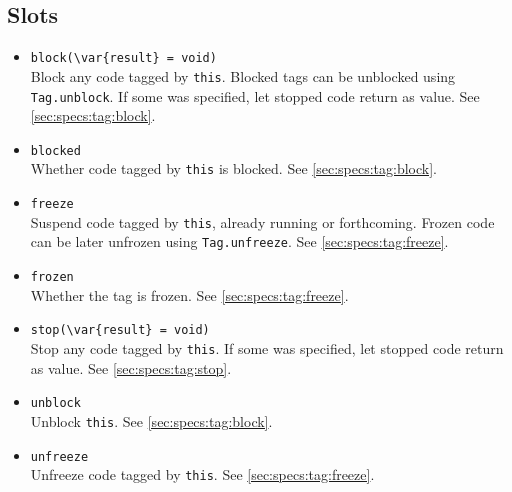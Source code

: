 \subsection{Slots}

\begin{itemize}
\item \lstinline|block(\var{result} = void)|~\\
  Block any code tagged by \lstinline|this|.  Blocked tags can be
  unblocked using \lstinline|Tag.unblock|.  If some  was
  specified, let stopped code return  as value.  See
  \autoref{sec:specs:tag:block}.

\item \lstinline|blocked|~\\
  Whether code tagged by \lstinline|this| is blocked.  See
  \autoref{sec:specs:tag:block}.

\item \lstinline|freeze|~\\
  Suspend code tagged by \lstinline|this|, already running or
  forthcoming.  Frozen code can be later unfrozen using
  \lstinline|Tag.unfreeze|.  See \autoref{sec:specs:tag:freeze}.

\item \lstinline|frozen|~\\
  Whether the tag is frozen. See  \autoref{sec:specs:tag:freeze}.

\item \lstinline|stop(\var{result} = void)|~\\
  Stop any code tagged by \lstinline|this|.  If some  was
  specified, let stopped code return  as value.
  See \autoref{sec:specs:tag:stop}.

\item \lstinline|unblock|~\\
  Unblock \lstinline|this|.  See \autoref{sec:specs:tag:block}.

\item \lstinline|unfreeze|~\\
  Unfreeze code tagged by \lstinline|this|.  See
  \autoref{sec:specs:tag:freeze}.
\end{itemize}

